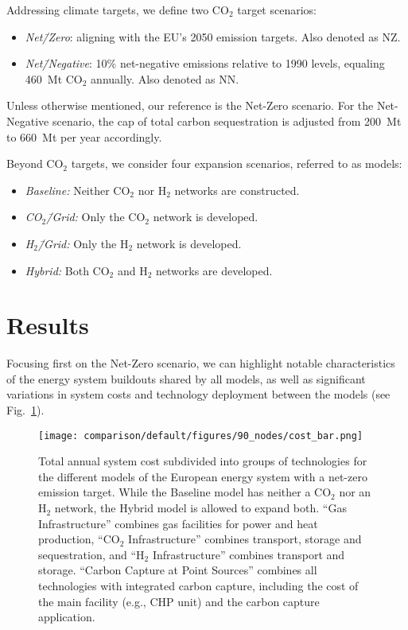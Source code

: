 \documentclass[twocolumn]{article}
\newcommand{\COtwo}{CO$_2$}
\newcommand{\Htwo}{H$_2$}
\newcommand{\COgrid}{CO$_2$\=/Grid}
\newcommand{\Hgrid}{H$_2$\=/Grid}
\newcommand{\modBase}{Baseline model}
\newcommand{\modHybrid}{Hybrid model}
\begin{document}
Addressing climate targets, we define two \COtwo{} target scenarios:
\begin{itemize}
    \item[] \textit{Net\=/Zero}: aligning with the EU's 2050 emission targets. Also denoted as NZ.
    \item[] \textit{Net\=/Negative}: 10\% net-negative emissions relative to 1990 levels, equaling 460~Mt \COtwo{} annually. Also denoted as NN.
\end{itemize}
Unless otherwise mentioned, our reference is the Net-Zero scenario. For the Net-Negative scenario, the cap of total carbon sequestration is adjusted from 200~Mt to 660~Mt per year accordingly.

Beyond \COtwo{} targets, we consider four expansion scenarios, referred to as models:
\begin{itemize}
    \item[] \textit{Baseline:} Neither \COtwo{} nor \Htwo{} networks are constructed.
    \item[] \textit{\COgrid{}:} Only the \COtwo{} network is developed.
    \item[] \textit{\Hgrid{}:} Only the \Htwo{} network is developed.
    \item[] \textit{Hybrid:} Both \COtwo{} and \Htwo{} networks are developed.
\end{itemize}




\section{Results}
\label{sec:results}


Focusing first on the Net-Zero scenario, we can highlight notable characteristics of the energy system buildouts shared by all models, as well as significant variations in system costs and technology deployment between the models (see Fig.~\ref{fig:cost_bar}).

\begin{figure}[ht!]
    \centering
    \texttt{[image: comparison/default/figures/90\_nodes/cost\_bar.png]}
    \caption[short]{Total annual system cost subdivided into groups of technologies for the different models of the European energy system with a net-zero emission target. While the \modBase{} has neither a \COtwo{} nor an \Htwo{} network, the \modHybrid{} is allowed to expand both. ``Gas Infrastructure'' combines gas facilities for power and heat production, ``\COtwo{} Infrastructure'' combines transport, storage and sequestration, and ``\Htwo{} Infrastructure'' combines transport and storage. ``Carbon Capture at Point Sources'' combines all technologies with integrated carbon capture, including the cost of the main facility (e.g., CHP unit) and the carbon capture application.}
    \label{fig:cost_bar}
\end{figure}
\end{document}
